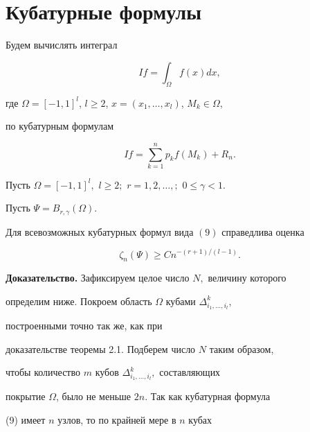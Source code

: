 \section{Кубатурные формулы}





Будем вычислять интеграл


$$


If=\int_\Omega f(x) dx,


$$


где $\Omega=[-1,1]^l$, $l \ge 2$, $x=(x_1,\dotsc,x_l)$, $M_k \in \Omega$,


по кубатурным формулам


\begin {equation}


If=\sum_{k=1}^ n p_k f(M_k)+R_n.


\end {equation}





\begin{thms}


Пусть $\Omega=[-1,1]^l,$ $l\ge 2;$ $r=1,2,\dotsc,;$ $0 \le \gamma <1.$


Пусть $\Psi=B_{r,\gamma}(\Omega).$


Для всевозможных кубатурных формул вида $(9)$ справедлива оценка


\begin {equation}


\zeta_n(\Psi) \ge Cn^{-(r+1)/(l-1)}.


\end {equation}


\end{thms}





{\bf Доказательство.} Зафиксируем целое число $N,$ величину которого


определим ниже. Покроем область $\Omega$ кубами $\Delta^k_{i_1,\dotsc,i_l},$


построенными точно так же, как при


доказательстве теоремы 2.1. Подберем число $N$ таким образом,


чтобы количество $m$ кубов $\Delta^k_{i_1,\dotsc,i_l},$ составляющих


покрытие $\Omega$, было не меньше $2n.$ Так как кубатурная формула


(9) имеет $n$ узлов, то по крайней мере в $n$ кубах



